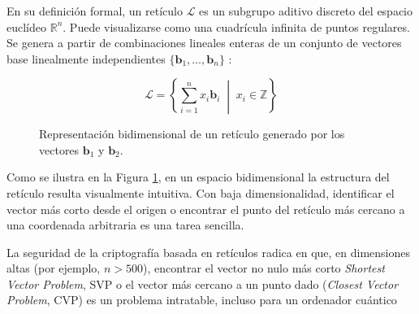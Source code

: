 \documentclass[11pt, a4paper]{report}
\theoremstyle{definition}
\begin{document}
En su definición formal, un retículo $\mathcal{L}$ es un subgrupo aditivo discreto del espacio euclídeo $\mathbb{R}^n$. Puede visualizarse como una cuadrícula infinita de puntos regulares. Se genera a partir de combinaciones lineales enteras de un conjunto de vectores base linealmente independientes $\{ \mathbf{b}_1, \dots, \mathbf{b}_n \}$ \cite{peikert2016decade}:

$$ \mathcal{L} = \left\{ \sum_{i=1}^n x_i \mathbf{b}_i \;\middle|\; x_i \in \mathbb{Z} \right\} $$

\begin{figure}[H]
    \centering
    \caption{Representación bidimensional de un retículo generado por los vectores $\mathbf{b}_1$ y $\mathbf{b}_2$.}
    \label{fig:reticulo_2d}
\end{figure}

Como se ilustra en la Figura \ref{fig:reticulo_2d}, en un espacio bidimensional la estructura del retículo resulta visualmente intuitiva. Con baja dimensionalidad, identificar el vector más corto desde el origen o encontrar el punto del retículo más cercano a una coordenada arbitraria es una tarea sencilla.

La seguridad de la criptografía basada en retículos radica en que, en dimensiones altas (por ejemplo, $n > 500$), encontrar el vector no nulo más corto \textit{Shortest Vector Problem}, SVP o el vector más cercano a un punto dado (\textit{Closest Vector Problem}, CVP) es un problema intratable, incluso para un ordenador cuántico   
\end{document}
